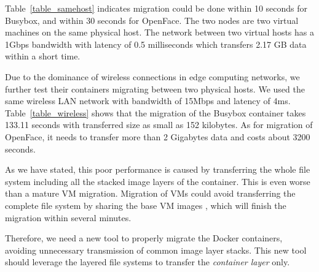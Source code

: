 Table~\ref{table_samehost} indicates migration could be done within 10 seconds for Busybox, and within 30 seconds for OpenFace. The two nodes are two virtual machines on the same physical host. The network between two virtual hosts has a 1Gbps bandwidth with latency of 0.5 milliseconds which transfers 2.17 GB data within a short time.

Due to the dominance of wireless connections in edge computing networks, we further test their containers migrating  between two physical hosts. We used the same wireless LAN network with bandwidth of 15Mbps and latency of 4ms. Table~\ref{table_wireless} shows that the migration of the Busybox container takes 133.11 seconds with transferred size as small as 152 kilobytes. As for migration of OpenFace, it needs to transfer more than 2 Gigabytes data and  costs about 3200 seconds. 

As we have stated, this poor performance is caused by transferring  the whole file system including all the stacked image layers of the container. This is even worse than a mature VM migration. Migration of VMs could avoid transferring the complete file system by sharing the base VM images
    \cite{ha2015vmhandoff}, which will finish the migration within several minutes. 

Therefore, we need a new tool to properly migrate the Docker containers, avoiding unnecessary transmission of common image layer stacks.   
This new tool should leverage the layered file systems to  transfer the \textit{container layer} only.

